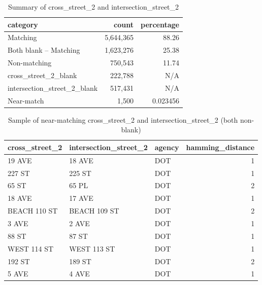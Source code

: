 \documentclass[12pt, titlepage]{article}
\begin{document}
\begin{table}[H]
    \centering
    \footnotesize
    \begin{tabular}{l r r}
        \toprule
        \textbf{category} & \textbf{count} & \textbf{percentage} \\
        \midrule
        Matching                    & 5,644,365 & 88.26     \\
        Both blank -- Matching      & 1,623,276 & 25.38     \\
        Non-matching                &   750,543 & 11.74     \\
        cross\_street\_2\_blank     &   222,788 & N/A       \\
        intersection\_street\_2\_blank &   517,431 & N/A       \\
        Near-match                  &     1,500 & 0.023456  \\
        \bottomrule
    \end{tabular}
    \caption{Summary of cross\_street\_2 and intersection\_street\_2}
    \label{tab:summary_cross_intersection_2}
\end{table}

\begin{table}[H]
    \centering
    \footnotesize
    \begin{tabular}{l l l r}
        \toprule
        \textbf{cross\_street\_2} & \textbf{intersection\_street\_2} & \textbf{agency} & \textbf{hamming\_distance} \\
        \midrule
        19 AVE         & 18 AVE                & DOT    & 1 \\
        227 ST         & 225 ST                & DOT    & 1 \\
        65 ST          & 65 PL                 & DOT    & 2 \\
        18 AVE         & 17 AVE                & DOT    & 1 \\
        BEACH 110 ST   & BEACH 109 ST          & DOT    & 2 \\
        3 AVE          & 2 AVE                 & DOT    & 1 \\
        88 ST          & 87 ST                 & DOT    & 1 \\
        WEST 114 ST    & WEST 113 ST           & DOT    & 1 \\
        192 ST         & 189 ST                & DOT    & 2 \\
        5 AVE          & 4 AVE                 & DOT    & 1 \\
        \bottomrule
    \end{tabular}
    \caption{Sample of near-matching cross\_street\_2 and intersection\_street\_2 (both non-blank)}
    \label{tab:near_matching_cross_intersection_2}
\end{table}
\end{document}
